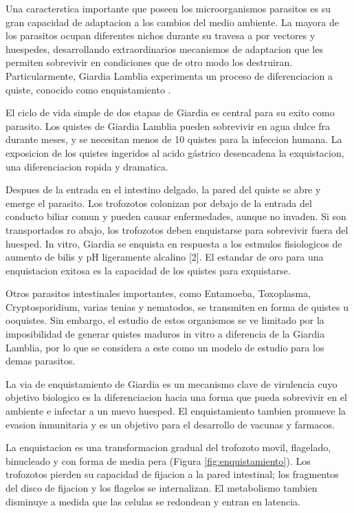     Una caracterstica importante que poseen los microorganismos parasitos es su gran capacidad de
    adaptacion a los cambios del medio ambiente. La mayora de los parasitos ocupan
    diferentes nichos durante su travesa a por vectores y huespedes, desarrollando extraordinarios
    mecanismos de adaptacion que les permiten sobrevivir en condiciones que de otro modo
    los destruiran. Particularmente, Giardia Lamblia experimenta un proceso de diferenciacion
    a quiste, conocido como enquistamiento \cite{gda}.

    El ciclo de vida simple de dos etapas de Giardia es central para su exito como parasito. Los
    quistes de Giardia Lamblia pueden sobrevivir en agua dulce fra durante meses, y se necesitan
    menos de 10 quistes para la infeccion humana. La exposicion de los quistes ingeridos al acido
    gástrico desencadena la exquistacion, una diferenciacion ropida y dramatica.

    Despues de la entrada en el intestino delgado, la pared del quiste se abre y emerge el
    parasito. Los trofozotos colonizan por debajo de la entrada del conducto biliar comun y pueden
    causar enfermedades, aunque no invaden. Si son transportados ro abajo, los trofozotos
    deben enquistarse para sobrevivir fuera del huesped. In vitro, Giardia se enquista en respuesta a
    los estmulos fisiologicos de aumento de bilis y pH ligeramente alcalino [2]. El estandar
    de oro para una enquistacion exitosa es la capacidad de los quistes para exquistarse.

    Otros parasitos intestinales importantes, como Entamoeba, Toxoplasma, Cryptosporidium, varias
    tenias y nematodos, se transmiten en forma de quistes u ooquistes. Sin embargo,
    el estudio de estos organismos se ve limitado por la imposibilidad de generar quistes maduros
    in vitro a diferencia de la Giardia Lamblia, por lo que se considera a este como un modelo
    de estudio para los demas parasitos.

    La via de enquistamiento de Giardia es un mecanismo clave de virulencia cuyo objetivo
    biologico es la diferenciacion hacia una forma que pueda sobrevivir en el ambiente e infectar
    a un nuevo huesped. El enquistamiento tambien promueve la evasion inmunitaria y es un
    objetivo para el desarrollo de vacunas y farmacos.

    La enquistacion es una transformacion gradual
    del trofozoto movil, flagelado, binucleado y con forma de media pera (Figura \ref{fig:enquistamiento}).
    Los trofozotos pierden su capacidad de fijacion a la pared intestinal; los fragmentos del disco de
    fijacion y los flagelos se internalizan. El metabolismo tambien disminuye a medida que las celulas
    se redondean y entran en latencia.


